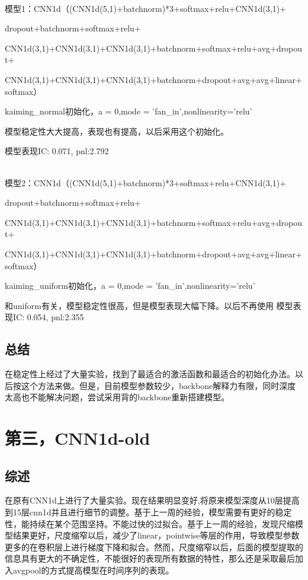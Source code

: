 \documentclass[11pt]{ctexart}
\begin{document}
~\\
模型1：CNN1d（(CNN1d(5,1)+batchnorm)*3+softmax+relu+CNN1d(3,1)+

dropout+batchnorm+softmax+relu+

CNN1d(3,1)+CNN1d(3,1)+CNN1d(3,1)+batchnorm+softmax+relu+avg+dropout+

CNN1d(3,1)+CNN1d(3,1)+CNN1d(3,1)+batchnorm+dropout+avg+avg+linear+softmax）

kaiming\_normal初始化，a = 0,mode = 'fan\_in',nonlinearity='relu'

模型稳定性大大提高，表现也有提高，以后采用这个初始化。

模型表现{\kaishu \small IC: 0.071, pnl:2.792}

~\\
模型2：CNN1d（(CNN1d(5,1)+batchnorm)*3+softmax+relu+CNN1d(3,1)+

dropout+batchnorm+softmax+relu+

CNN1d(3,1)+CNN1d(3,1)+CNN1d(3,1)+batchnorm+softmax+relu+avg+dropout+

CNN1d(3,1)+CNN1d(3,1)+CNN1d(3,1)+batchnorm+dropout+avg+avg+linear+softmax）

kaiming\_uniform初始化，a = 0,mode = 'fan\_in',nonlinearity='relu'

和uniform有关，模型稳定性很高，但是模型表现大幅下降。以后不再使用
模型表现{\kaishu \small IC: 0.054, pnl:2.355}

\subsection{总结}

在稳定性上经过了大量实验，找到了最适合的激活函数和最适合的初始化办法。以后按这个方法来做。但是，目前模型参数较少，backbone解释力有限，同时深度太高也不能解决问题，尝试采用背的backbone重新搭建模型。


\section{第三，CNN1d-old}
\subsection{综述}
在原有CNN1d上进行了大量实验。现在结果明显变好,将原来模型深度从10层提高到15层cnn1d并且进行细节的调整。基于上一周的经验，模型需要有更好的稳定性，能持续在某个范围坚持。不能过快的过拟合。基于上一周的经验，发现尺缩模型结果更好，尺度缩窄以后，减少了linear，pointwise等层的作用，导致模型参数更多的在卷积层上进行梯度下降和拟合。然而，尺度缩窄以后，后面的模型提取的信息具有更大的不确定性，不能很好的表现所有数据的特性，那么还是采取最后加入avgpool的方式提高模型在时间序列的表现。
\end{document}
